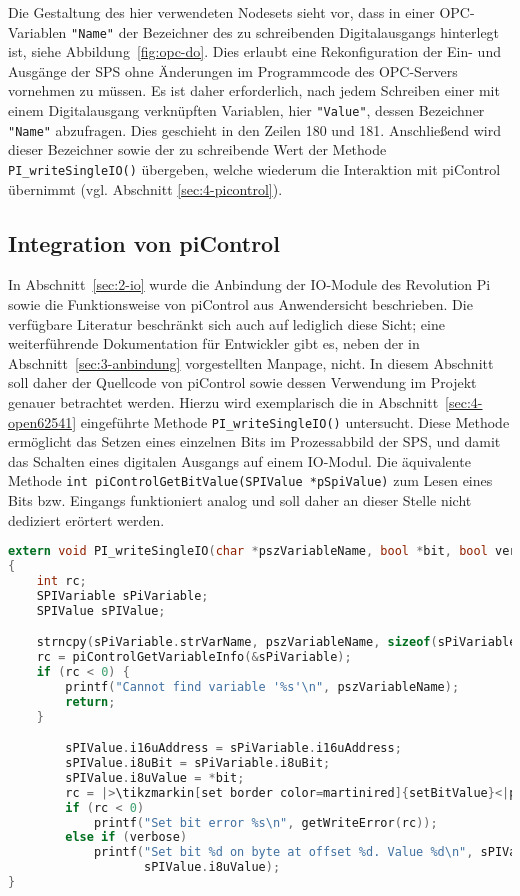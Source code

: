 Die Gestaltung des hier verwendeten Nodesets sieht vor, dass in einer OPC-Variablen \lstinline{"Name"} der Bezeichner des zu schreibenden Digitalausgangs hinterlegt ist, siehe Abbildung~\ref{fig:opc-do}. Dies erlaubt eine Rekonfiguration der Ein- und Ausgänge der SPS ohne Änderungen im Programmcode des OPC-Servers vornehmen zu müssen.
Es ist daher erforderlich, nach jedem Schreiben einer mit einem Digitalausgang verknüpften Variablen, hier \lstinline{"Value"}, dessen Bezeichner \lstinline{"Name"} abzufragen. 
Dies geschieht in den Zeilen 180 und 181.
Anschließend wird dieser Bezeichner sowie der zu schreibende Wert der Methode \lstinline{PI_writeSingleIO()} übergeben, welche wiederum die Interaktion mit piControl übernimmt (vgl. Abschnitt \ref{sec:4-picontrol}).
 
\subsection{Integration von piControl%
     \label{sec:4-picontrol}}
In Abschnitt~\ref{sec:2-io} wurde die Anbindung der IO-Module des Revolution Pi sowie die Funktionsweise von piControl aus Anwendersicht beschrieben. Die verfügbare Literatur beschränkt sich auch auf lediglich diese Sicht; eine weiterführende Dokumentation für Entwickler gibt es, neben der in Abschnitt~\ref{sec:3-anbindung} vorgestellten Manpage, nicht. 
In diesem Abschnitt soll daher der Quellcode von piControl sowie dessen Verwendung im Projekt genauer betrachtet werden.
Hierzu wird exemplarisch die in Abschnitt~\ref{sec:4-open62541} eingeführte Methode \lstinline{PI_writeSingleIO()} untersucht.
Diese Methode ermöglicht das Setzen eines einzelnen Bits im Prozessabbild der SPS, und damit das Schalten eines digitalen Ausgangs auf einem IO-Modul.
Die äquivalente Methode \lstinline{int piControlGetBitValue(SPIValue *pSpiValue)} zum Lesen eines Bits bzw. Eingangs funktioniert analog und soll daher an dieser Stelle nicht dediziert erörtert werden.

\begin{lstlisting}[language={c},firstnumber=97,
                   caption={Setzen eines phsikalischen, digitalen Ausgangs in \lstinline{revpi.c}
                   \label{lst:4-PI_writeSingleIO}}]
extern void PI_writeSingleIO(char *pszVariableName, bool *bit, bool verbose)
{
	int rc;
	SPIVariable sPiVariable;
	SPIValue sPIValue;

	strncpy(sPiVariable.strVarName, pszVariableName, sizeof(sPiVariable.strVarName));
	rc = piControlGetVariableInfo(&sPiVariable);
	if (rc < 0) {
		printf("Cannot find variable '%s'\n", pszVariableName);
		return;
	}

		sPIValue.i16uAddress = sPiVariable.i16uAddress;
		sPIValue.i8uBit = sPiVariable.i8uBit;
		sPIValue.i8uValue = *bit;
		rc = |>\tikzmarkin[set border color=martinired]{setBitValue}<|piControlSetBitValue(&sPIValue)|>\tikzmarkend{setBitValue}<|;
		if (rc < 0)
			printf("Set bit error %s\n", getWriteError(rc));
		else if (verbose)
			printf("Set bit %d on byte at offset %d. Value %d\n", sPIValue.i8uBit, sPIValue.i16uAddress,
			       sPIValue.i8uValue);
}
\end{lstlisting}

